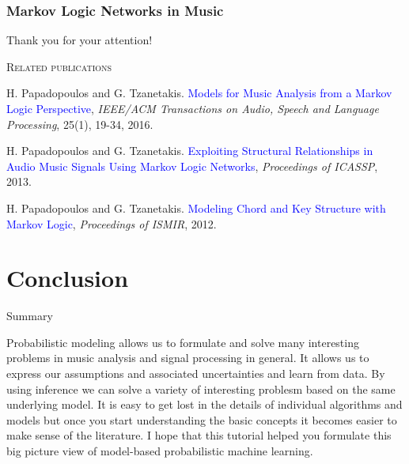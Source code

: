 \documentclass[12pt]{beamer}
\begin{document}
\begin{frame}
\frametitle{Markov Logic Networks in Music}

\begin{center}
Thank you for your attention!
\end{center}
\bigskip

\begin{small}

\begin{center}
\rmfamily\textsc{Related publications}\normalfont
\end{center}

H. Papadopoulos and G. Tzanetakis. \textcolor{blue}{Models for Music Analysis
  from a Markov Logic Perspective}, \textit{IEEE/ACM Transactions on Audio, Speech and Language Processing}, 25(1), 19-34, 2016. 

H. Papadopoulos and G. Tzanetakis. \textcolor{blue}{Exploiting Structural Relationships in Audio Music Signals Using Markov Logic Networks}, \textit{Proceedings of ICASSP}, 2013.
\medskip

H. Papadopoulos and G. Tzanetakis. \textcolor{blue}{Modeling Chord and Key Structure with Markov Logic}, \textit{Proceedings of ISMIR}, 2012.
\medskip

\end{small}

\end{frame}

\section{Conclusion} 

\begin{frame}{Summary}

  Probabilistic modeling allows us to formulate and solve many
  interesting problems in music analysis and signal processing in
  general. It allows us to express our assumptions and associated
  uncertainties and learn from data. By using inference we can solve a
  variety of interesting problesm based on the same underlying model.
  It is easy to get lost in the details of individual algorithms and
  models but once you start understanding the basic concepts it
  becomes easier to make sense of the literature. I hope that this
  tutorial helped you formulate this big picture view of model-based
  probabilistic machine learning.
  
  \end{frame} 



 
\end{document}
